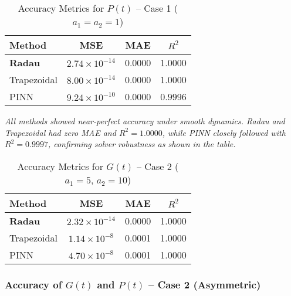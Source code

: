 \documentclass[journal]{IEEEtran}
\begin{document}
\begin{table}[h!]
\centering
\caption{Accuracy Metrics for $P(t)$ – Case 1 ($a_1 = a_2 = 1$)}
\label{tab:case1_P}
\begin{tabular}{|l|c|c|c|}
\hline
\textbf{Method} & \textbf{MSE} & \textbf{MAE} & \textbf{$R^2$} \\
\hline
\textbf{Radau}        & $2.74\times10^{-14}$ & 0.0000 & 1.0000 \\
Trapezoidal  & $8.00\times10^{-14}$ & 0.0000 & 1.0000 \\
PINN         & $9.24\times10^{-10}$ & 0.0000 & 0.9996 \\
\hline
\end{tabular}
\end{table}
\textit{All methods showed near-perfect accuracy under smooth dynamics. Radau and Trapezoidal had zero MAE and $R^2 = 1.0000$, while PINN closely followed with $R^2 = 0.9997$, confirming solver robustness as shown in the table.}

\begin{table}[h!]
\centering
\caption{Accuracy Metrics for $G(t)$ – Case 2 ($a_1 = 5$, $a_2 = 10$)}
\label{tab:case2_G}
\begin{tabular}{|l|c|c|c|}
\hline
\textbf{Method} & \textbf{MSE} & \textbf{MAE} & \textbf{$R^2$} \\
\hline
\textbf{Radau}        & $2.32\times10^{-14}$ & 0.0000 & 1.0000 \\
Trapezoidal  & $1.14\times10^{-8}$  & 0.0001 & 1.0000 \\
PINN         & $4.70\times10^{-8}$  & 0.0001 & 1.0000 \\
\hline
\end{tabular}
\end{table}

\subsubsection*{Accuracy of $G(t)$ and $P(t)$ – Case 2 (Asymmetric)}
\end{document}
